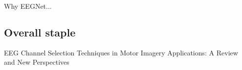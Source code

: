 \documentclass{Configuration_Files/PoliMi3i_thesis}
\begin{document}
Why EEGNet...

\subsection{Overall staple}
{EEG Channel Selection Techniques in Motor Imagery Applications: A Review and New Perspectives}



\end{document}
